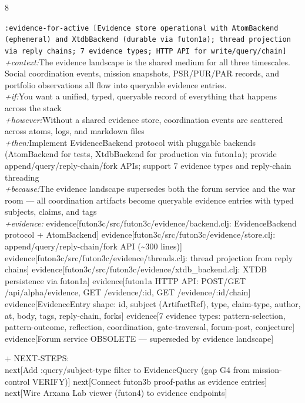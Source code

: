 \documentclass[landscape]{article}
\newcommand{\flexitag}[1]{\textcolor[gray]{0.35}{\textit{#1}}}
\newenvironment{devmapactive}{%
  \def\FrameCommand{\colorbox{devmapactivebg}}%
  \setlength{\fboxsep}{2pt}%
  \MakeFramed{\advance\hsize-\width \FrameRestore}%
}{\endMakeFramed}
\begin{document}
\begin{paracol}{8}
\begin{devmapactive}
  \texttt{:\allowbreak{}evidence-\allowbreak{}for-\allowbreak{}active [Evidence store operational with AtomBackend (ephemeral) and XtdbBackend (durable via futon1a);\allowbreak{} thread projection via reply chains;\allowbreak{} 7 evidence types;\allowbreak{} HTTP API for write/\allowbreak{}query/\allowbreak{}chain]}\\
  \flexitag{+context:}The evidence landscape is the shared medium for all three timescales. Social coordination events, mission snapshots, PSR/PUR/PAR records, and portfolio observations all flow into queryable evidence entries.\\
  \flexitag{+if:}You want a unified, typed, queryable record of everything that happens across the stack\\
  \flexitag{+however:}Without a shared evidence store, coordination events are scattered across atoms, logs, and markdown files\\
  \flexitag{+then:}Implement EvidenceBackend protocol with pluggable backends (AtomBackend for tests, XtdbBackend for production via futon1a); provide append/query/reply-chain/fork APIs; support 7 evidence types and reply-chain threading\\
  \flexitag{+because:}The evidence landscape supersedes both the forum service and the war room — all coordination artifacts become queryable evidence entries with typed subjects, claims, and tags\\
  \flexitag{+evidence:} evidence[futon3c/src/futon3c/evidence/backend.clj: EvidenceBackend protocol + AtomBackend] evidence[futon3c/src/futon3c/evidence/store.clj: append/query/reply-chain/fork API (\textasciitilde{}300 lines)] evidence[futon3c/src/futon3c/evidence/threads.clj: thread projection from reply chains] evidence[futon3c/src/futon3c/evidence/xtdb\_backend.clj: XTDB persistence via futon1a] evidence[futon1a HTTP API: POST/GET /api/alpha/evidence, GET /evidence/:id, GET /evidence/:id/chain] evidence[EvidenceEntry shape: id, subject (ArtifactRef), type, claim-type, author, at, body, tags, reply-chain, forks] evidence[7 evidence types: pattern-selection, pattern-outcome, reflection, coordination, gate-traversal, forum-post, conjecture] evidence[Forum service OBSOLETE — superseded by evidence landscape]\\
\par
  + NEXT-STEPS:\\
    next[Add :query/subject-type filter to EvidenceQuery (gap G4 from mission-control VERIFY)] next[Connect futon3b proof-paths as evidence entries] next[Wire Arxana Lab viewer (futon4) to evidence endpoints]\\

\end{devmapactive}
\end{paracol}
\end{document}
